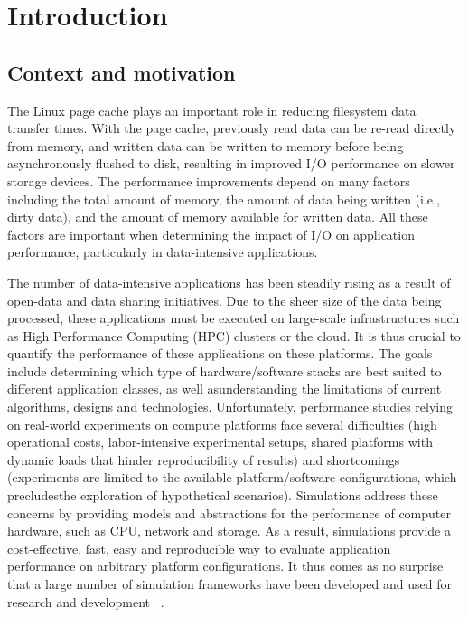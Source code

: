 \chapter{Introduction}
\label{introduction}

\section{Context and motivation}

The Linux page cache plays an important role in reducing filesystem data 
transfer times. With the page cache, previously read data can be re-read 
directly from memory, and written data can be written to memory before 
being asynchronously flushed to disk, resulting in improved I/O performance
on slower storage devices. The performance improvements depend on many 
factors including the total amount of memory, the amount of data being 
written (i.e., dirty data), and the amount of memory available for
written data. All these factors are important when determining the impact 
of I/O on application performance, particularly in data-intensive applications.

The number of data-intensive applications has been steadily rising as a result of
open-data and data sharing initiatives. Due to the sheer size of the data being
processed, these applications must be executed on large-scale infrastructures
such as High Performance Computing (HPC) clusters or the cloud.  
It is thus crucial to quantify the performance of these applications
on these platforms. The goals include determining which type of hardware/software
stacks are best suited to different application classes, as well asunderstanding 
the limitations of current algorithms, designs and technologies. 
Unfortunately, performance studies relying on real-world experiments on 
compute platforms face several difficulties (high operational costs, 
labor-intensive experimental setups, shared platforms with dynamic loads 
that hinder reproducibility of results) and shortcomings
(experiments are limited to the available platform/software configurations, 
which precludesthe exploration of hypothetical scenarios). 
Simulations address these concerns by providing models and abstractions 
for the performance of computer hardware, such as CPU, network and storage. 
As a result, simulations provide a cost-effective, fast, easy and reproducible 
way to evaluate application performance on arbitrary platform configurations. 
It thus comes as no surprise that a large number of simulation frameworks 
have been developed and used for research and development
~\cite{ optorsim, gridsim, groudsim, cloudsim, nunez2012simcan,
nunez2012icancloud, mdcsim, dissect_cf, cloudnetsimplusplus, fognetsimplusplus, casanova2014simgrid, ROSS, casanova2020fgcs}. 

